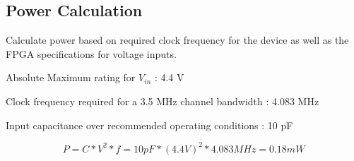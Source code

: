 \documentclass[10pt,twocolumn]{article}
\begin{document}
  \subsection{Power Calculation}
  
  Calculate power based on required clock frequency for the device as well as the
  FPGA specifications for voltage inputs.
  
  Absolute Maximum rating for $V_{in}$ : 4.4 V
  
  Clock frequency required for a 3.5 MHz channel bandwidth : 4.083 MHz
  
  Input capacitance over recommended operating conditions : 10 pF
  \begin{center}
  \begin{equation}
  P = C * V^2 * f = 10 pF * (4.4 V)^2 * 4.083 MHz = 0.18 mW
  \end{equation}
  \end{center}
  
\end{document}
